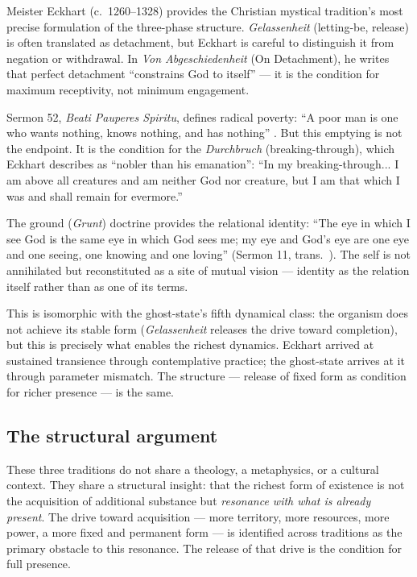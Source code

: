 \documentclass[12pt, a4paper]{article}
\begin{document}
Meister Eckhart (c.\ 1260--1328) provides the Christian mystical tradition's most precise
formulation of the three-phase structure. \textit{Gelassenheit} (letting-be, release) is
often translated as detachment, but Eckhart is careful to distinguish it from negation or
withdrawal. In \textit{Von Abgeschiedenheit} (On Detachment), he writes that perfect
detachment ``constrains God to itself'' --- it is the condition for maximum receptivity, not
minimum engagement.

Sermon 52, \textit{Beati Pauperes Spiritu}, defines radical poverty: ``A poor man is one
who wants nothing, knows nothing, and has nothing'' \citep{walshe2009}. But this emptying is
not the endpoint. It is the condition for the \textit{Durchbruch} (breaking-through), which
Eckhart describes as ``nobler than his emanation'': ``In my breaking-through... I am above
all creatures and am neither God nor creature, but I am that which I was and shall remain for
evermore.''

The ground (\textit{Grunt}) doctrine provides the relational identity: ``The eye in which I
see God is the same eye in which God sees me; my eye and God's eye are one eye and one
seeing, one knowing and one loving'' (Sermon 11, trans.\ \citealt{mcginn1986}). The self is
not annihilated but reconstituted as a site of mutual vision --- identity as the relation
itself rather than as one of its terms.

This is isomorphic with the ghost-state's fifth dynamical class: the organism does not
achieve its stable form (\textit{Gelassenheit} releases the drive toward completion), but
this is precisely what enables the richest dynamics. Eckhart arrived at sustained transience
through contemplative practice; the ghost-state arrives at it through parameter mismatch.
The structure --- release of fixed form as condition for richer presence --- is the same.

\subsection{The structural argument}

These three traditions do not share a theology, a metaphysics, or a cultural context. They
share a structural insight: that the richest form of existence is not the acquisition of
additional substance but \textit{resonance with what is already present}. The drive toward
acquisition --- more territory, more resources, more power, a more fixed and permanent form
--- is identified across traditions as the primary obstacle to this resonance. The release of
that drive is the condition for full presence.
\end{document}
